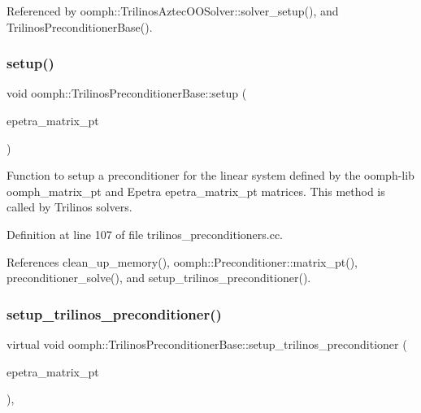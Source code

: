 Referenced by oomph\+::\+Trilinos\+Aztec\+O\+O\+Solver\+::solver\+\_\+setup(), and Trilinos\+Preconditioner\+Base().

\mbox{\label{classoomph_1_1TrilinosPreconditionerBase_a5548dff11ca795d13386ca64956a2c73}} 
\subsubsection{\texorpdfstring{setup()}{setup()}\hspace{0.1cm}{\footnotesize\ttfamily [2/2]}}
{\footnotesize\ttfamily void oomph\+::\+Trilinos\+Preconditioner\+Base\+::setup (\begin{DoxyParamCaption}\item[{Epetra\+\_\+\+Crs\+Matrix $\ast$}]{epetra\+\_\+matrix\+\_\+pt }\end{DoxyParamCaption})}



Function to setup a preconditioner for the linear system defined by the oomph-\/lib oomph\+\_\+matrix\+\_\+pt and Epetra epetra\+\_\+matrix\+\_\+pt matrices. This method is called by Trilinos solvers. 



Definition at line 107 of file trilinos\+\_\+preconditioners.\+cc.



References clean\+\_\+up\+\_\+memory(), oomph\+::\+Preconditioner\+::matrix\+\_\+pt(), preconditioner\+\_\+solve(), and setup\+\_\+trilinos\+\_\+preconditioner().

\mbox{\label{classoomph_1_1TrilinosPreconditionerBase_aeb2b1cee61617fd68a8beb911ddc4a62}} 
\subsubsection{\texorpdfstring{setup\+\_\+trilinos\+\_\+preconditioner()}{setup\_trilinos\_preconditioner()}}
{\footnotesize\ttfamily virtual void oomph\+::\+Trilinos\+Preconditioner\+Base\+::setup\+\_\+trilinos\+\_\+preconditioner (\begin{DoxyParamCaption}\item[{Epetra\+\_\+\+Crs\+Matrix $\ast$}]{epetra\+\_\+matrix\+\_\+pt }\end{DoxyParamCaption})\hspace{0.3cm}{\ttfamily [protected]}, {}}



